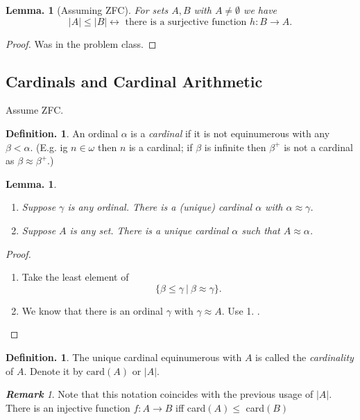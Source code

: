 \documentclass[a4paper,oneside,11pt,DIV=12,parskip=half]{scrartcl}
\theoremstyle{plain}
\newtheorem{lemma}[theorem]{Lemma.}
\theoremstyle{definition}
\newtheorem{definition}[theorem]{Definition.}
\newtheorem{remark, definition}[theorem]{Remark and Definition.}
\newtheorem{lemma, definition}[theorem]{Lemma and Definition.}
\newtheorem{theorem, definition}[theorem]{Theorem and Definition.}
\theoremstyle{remark}
\newtheorem*{remark}{\textbf{Remark}}
\newtheorem*{remark, example}{\textbf{Remark and Exercise}}
\begin{document}
\begin{lemma}[Assuming ZFC]
For sets $A,B$ with $A \neq \emptyset$ we have
    \[ |A| \leq |B| \leftrightarrow \text{ there is a surjective function } h: B \rightarrow A. \]
\end{lemma}
\begin{proof}
Was in the problem class.
\end{proof}

\subsection{Cardinals and Cardinal Arithmetic}
Assume ZFC.
\begin{definition}
An ordinal $\alpha$ is a \emph{cardinal} if it is not equinumerous with any $\beta < \alpha$. (E.g. ig $n \in \omega$ then $n$ is a cardinal; if $\beta$ is infinite then $\beta^+$ is not a cardinal as $\beta \approx \beta^+$.)
\end{definition}

\begin{lemma}
\begin{enumerate}
    \item Suppose $\gamma$ is any ordinal. There is a (unique) cardinal $\alpha$ with $\alpha \approx \gamma$.
    \item Suppose $A$ is any set. There is a unique cardinal $\alpha$ such that $A \approx \alpha$.
\end{enumerate}
\end{lemma}

\begin{proof}
\begin{enumerate}
    \item Take the least element of 
    \[ \{ \beta \leq \gamma ~|~ \beta \approx \gamma \}. \]
    \item We know that there is an ordinal $\gamma$ with $\gamma \approx A$. Use 1. .
\end{enumerate}
\end{proof}

\begin{definition}
The unique cardinal equinumerous with $A$ is called the \emph{cardinality} of $A$. Denote it by $\mathrm{card}(A)$ or $|A|$.
\end{definition}

\begin{remark}
Note that this notation coincides with the previous usage of $|A|$. There is an injective function $f: A \rightarrow B$ iff card$(A) \leq$ card$(B)$
\end{remark}
\end{document}
